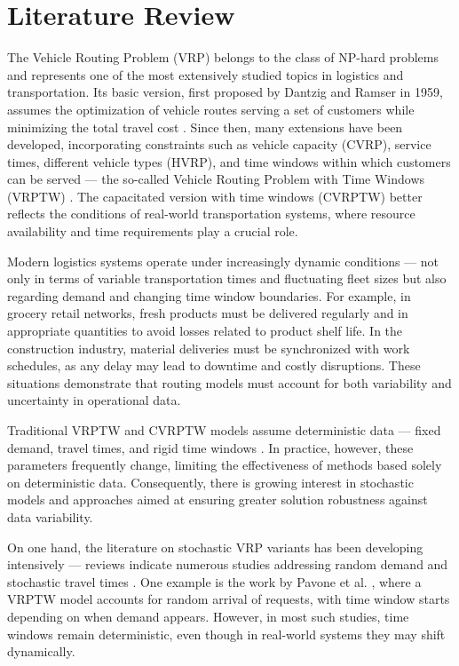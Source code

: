 \section{Literature Review}
The Vehicle Routing Problem (VRP) belongs to the class of NP-hard problems and represents one of the most extensively studied topics in logistics and transportation. Its basic version, first proposed by Dantzig and Ramser in 1959, assumes the optimization of vehicle routes serving a set of customers while minimizing the total travel cost \cite{Dantzig1959}. Since then, many extensions have been developed, incorporating constraints such as vehicle capacity (CVRP), service times, different vehicle types (HVRP), and time windows within which customers can be served — the so-called Vehicle Routing Problem with Time Windows (VRPTW) \cite{Toth2014, Golden2008}. The capacitated version with time windows (CVRPTW) better reflects the conditions of real-world transportation systems, where resource availability and time requirements play a crucial role.

Modern logistics systems operate under increasingly dynamic conditions — not only in terms of variable transportation times and fluctuating fleet sizes but also regarding demand and changing time window boundaries. For example, in grocery retail networks, fresh products must be delivered regularly and in appropriate quantities to avoid losses related to product shelf life. In the construction industry, material deliveries must be synchronized with work schedules, as any delay may lead to downtime and costly disruptions. These situations demonstrate that routing models must account for both variability and uncertainty in operational data.

Traditional VRPTW and CVRPTW models assume deterministic data — fixed demand, travel times, and rigid time windows \cite{surveyBraekers, RCVRPTWreviewYernar}. In practice, however, these parameters frequently change, limiting the effectiveness of methods based solely on deterministic data. Consequently, there is growing interest in stochastic models and approaches aimed at ensuring greater solution robustness against data variability.

On one hand, the literature on stochastic VRP variants has been developing intensively — reviews indicate numerous studies addressing random demand and stochastic travel times \cite{Oyola2018, Bomboi2022}. One example is the work by Pavone et al. \cite{Pavone2009}, where a VRPTW model accounts for random arrival of requests, with time window starts depending on when demand appears. However, in most such studies, time windows remain deterministic, even though in real-world systems they may shift dynamically.

